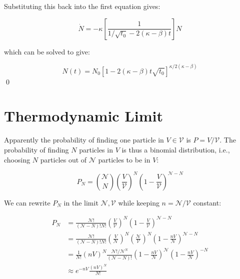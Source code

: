 \documentclass[12pt]{article}
\begin{document}
Substituting this back into the first equation gives:

\begin{equation}
    \dot{N} = -\kappa \left[ \frac{1}{1/\sqrt{t_{0}} - 2(\kappa - \beta) t} \right] N
\end{equation}

which can be solved to give:

\begin{equation}
    N(t) = N_{0} \left[ 1 - 2(\kappa - \beta) t \sqrt{t_{0}} \right]^{\kappa/2(\kappa - \beta)}
\end{equation}
\qed


\pagebreak
\section*{Thermodynamic Limit}


Apparently the probability of finding one particle in $V \in \mathcal{V}$ is $P = V/\mathcal{V}$. The probability of finding $N$ particles in $V$ is thus a binomial distribution, i.e., choosing $N$ particles out of $\mathcal{N}$ particles to be in $V$:

\begin{equation}
    P_{N} = \binom{\mathcal{N}}{N} \left( \frac{V}{\mathcal{V}} \right)^{N} \left( 1 - \frac{V}{\mathcal{V}} \right)^{\mathcal{N} - N}
\end{equation}

We can rewrite $P_{N}$ in the limit $\mathcal{N}, \mathcal{V}$ while keeping $n = \mathcal{N}/\mathcal{V}$ constant:

\begin{equation}
    \begin{split}
        P_{N} &= \frac{\mathcal{N}!}{(\mathcal{N} - N)! N!} \left( \frac{V}{\mathcal{V}} \right)^{N} \left( 1 - \frac{V}{\mathcal{V}} \right)^{\mathcal{N} - N} \\
        &= \frac{\mathcal{N}!}{(\mathcal{N} - N)! N!} \left( \frac{V}{\mathcal{N}} \right)^{N} \left( \frac{\mathcal{N}}{\mathcal{V}} \right)^{N} \left( 1 - \frac{nV}{\mathcal{N}} \right)^{\mathcal{N} - N} \\
        &= \frac{1}{N!} (nV)^{N} \frac{\mathcal{N}!/\mathcal{N}^{N}}{(\mathcal{N} - N)!} \left( 1 - \frac{nV}{\mathcal{N}} \right)^{\mathcal{N}} \left( 1 - \frac{nV}{\mathcal{N}} \right)^{-N} \\
        &\approx e^{-nV} \frac{(nV)^{N}}{N!}
    \end{split}
\end{equation}
\end{document}
